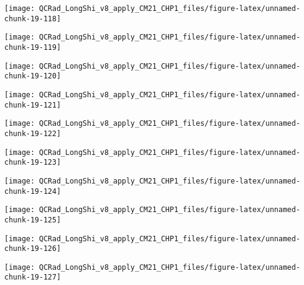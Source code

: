 \documentclass[
  10pt,
  a4paper,oneside]{article}
\begin{document}
\begin{center}\texttt{[image: QCRad\_LongShi\_v8\_apply\_CM21\_CHP1\_files/figure-latex/unnamed-chunk-19-118]} \end{center}

\begin{center}\texttt{[image: QCRad\_LongShi\_v8\_apply\_CM21\_CHP1\_files/figure-latex/unnamed-chunk-19-119]} \end{center}

\begin{center}\texttt{[image: QCRad\_LongShi\_v8\_apply\_CM21\_CHP1\_files/figure-latex/unnamed-chunk-19-120]} \end{center}

\begin{center}\texttt{[image: QCRad\_LongShi\_v8\_apply\_CM21\_CHP1\_files/figure-latex/unnamed-chunk-19-121]} \end{center}

\begin{center}\texttt{[image: QCRad\_LongShi\_v8\_apply\_CM21\_CHP1\_files/figure-latex/unnamed-chunk-19-122]} \end{center}

\begin{center}\texttt{[image: QCRad\_LongShi\_v8\_apply\_CM21\_CHP1\_files/figure-latex/unnamed-chunk-19-123]} \end{center}

\begin{center}\texttt{[image: QCRad\_LongShi\_v8\_apply\_CM21\_CHP1\_files/figure-latex/unnamed-chunk-19-124]} \end{center}

\begin{center}\texttt{[image: QCRad\_LongShi\_v8\_apply\_CM21\_CHP1\_files/figure-latex/unnamed-chunk-19-125]} \end{center}

\begin{center}\texttt{[image: QCRad\_LongShi\_v8\_apply\_CM21\_CHP1\_files/figure-latex/unnamed-chunk-19-126]} \end{center}

\begin{center}\texttt{[image: QCRad\_LongShi\_v8\_apply\_CM21\_CHP1\_files/figure-latex/unnamed-chunk-19-127]} \end{center}
\end{document}
